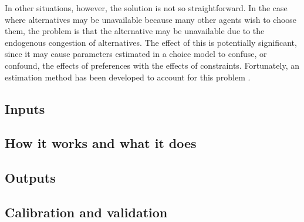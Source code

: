 In other situations, however, the solution is not so straightforward. In the case where alternatives may be unavailable because many other agents wish to choose them, the problem is that the alternative may be unavailable due to the endogenous congestion of alternatives. The effect of this is potentially significant, since it may cause parameters estimated in a choice model to confuse, or confound, the effects of preferences with the effects of constraints. Fortunately, an estimation method has been developed to account for this problem \citep{depalma-jue-2007}.


\subsection{Inputs}
\subsection{How it works and what it does}
\subsection{Outputs}
\subsection{Calibration and validation}